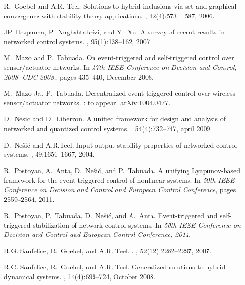 \documentclass[twocolumn]{autart}
\begin{document}
\begin{thebibliography}{10}
R.~Goebel and A.R. Teel.
\newblock Solutions to hybrid inclusions via set and graphical convergence with
  stability theory applications.
, 42(4):573 -- 587, 2006.

JP~Hespanha, P.~Naghshtabrizi, and Y.~Xu.
\newblock A survey of recent results in networked control systems.
, 95(1):138--162, 2007.

M.~Mazo and P.~Tabuada.
\newblock On event-triggered and self-triggered control over sensor/actuator
  networks.
\newblock In {\em 47th IEEE Conference on Decision and Control, 2008. CDC
  2008.}, pages 435--440, December 2008.

M.~Mazo Jr., P.~Tabuada.
\newblock Decentralized event-triggered control over wireless sensor/actuator networks.
:
to appear. arXiv:1004.0477.

D.~Nesic and D.~Liberzon.
\newblock A unified framework for design and analysis of networked and
  quantized control systems.
, 54(4):732--747, april
  2009.

D.~Ne\v{s}i\'{c} and A.R.Teel.
\newblock Input output stability properties of networked control systems.
, 49:1650--1667, 2004.

R.~Postoyan, A.~Anta, D.~Ne\v{s}i\'{c}, and P.~Tabuada.
\newblock A unifying Lyapunov-based framework for the event-triggered 
control of nonlinear systems.
\newblock In {\em 50th IEEE Conference on Decision and Control 
and European Control Conference}, pages 2559--2564, 2011.

R.~Postoyan, P.~Tabuada, D.~Ne\v{s}i\'{c}, and A.~Anta.
\newblock Event-triggered and self-triggered stabilization of network control systems.
\newblock In {\em 50th IEEE Conference on Decision and Control and 
European Control Conference, 2011.} 

R.G. Sanfelice, R.~Goebel, and A.R. Teel.
.
, 52(12):2282--2297,
  2007.

R.G. Sanfelice, R.~Goebel, and A.R. Teel.
\newblock Generalized solutions to hybrid dynamical systems.
, 14(4):699--724, October 2008.


\end{thebibliography}
\end{document}
